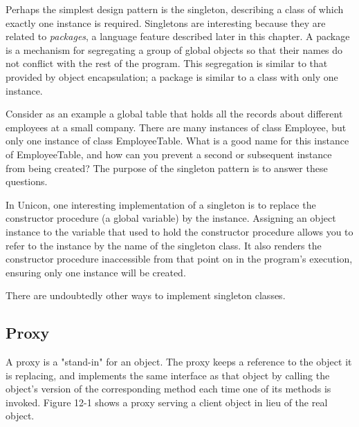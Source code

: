 Perhaps the simplest design pattern is the singleton,
describing a class of which exactly one instance
is required. Singletons are interesting because they are related to
\textit{packages}, a language feature described later in this chapter.
A package is a mechanism for segregating a group of
global objects so that their names do not conflict with the rest of the
program. This segregation is similar to that provided by object
encapsulation; a package is similar to a class with only one instance.

Consider as an example a global table that holds all the records about
different employees at a small company. There are many instances of
class \textsf{Employee}, but only one instance of class
\textsf{EmployeeTable}. What is a good name for this instance of
\textsf{EmployeeTable}, and how can you prevent a second or subsequent
instance from being created? The purpose of the singleton pattern is to
answer these questions.

In Unicon, one interesting implementation of a singleton is to replace
the constructor procedure (a global variable)
by the instance. Assigning an object instance to the variable that used
to hold the constructor procedure allows you to refer to the instance
by the name of the singleton class. It also renders the constructor
procedure inaccessible from that point on in the
program's execution, ensuring only one instance will
be created.


\noindent
There are undoubtedly other ways to implement singleton classes.

\subsection*{Proxy}

A proxy is a "stand-in"
for an object. The proxy keeps a reference to the
object it is replacing, and implements the same interface as that
object by calling the object's version of the
corresponding method each time one of its methods is invoked. Figure
12-1 shows a proxy serving a client object in lieu of the real object.

\bigskip

